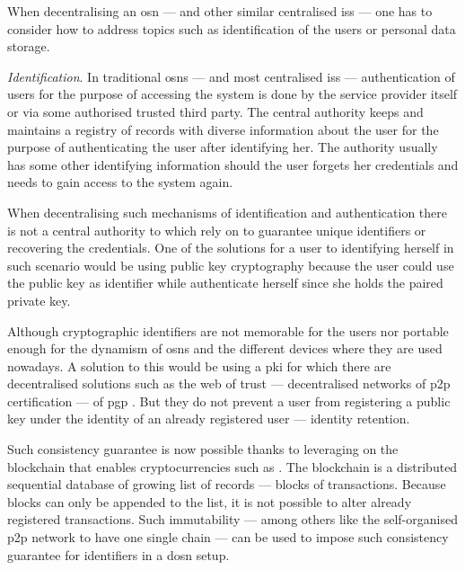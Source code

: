 When decentralising an \ac{osn} --- and other similar centralised \acp{is} --- one 
has to consider how to address topics such as identification of the users or personal 
data storage.

\textit{Identification}. In traditional \acp{osn} --- and most centralised \acp{is} 
--- authentication of users for the purpose of accessing the system is done by the 
service provider itself or via some authorised trusted third party. The central 
authority keeps and maintains a registry of records with diverse information about 
the user for the purpose of authenticating the user after identifying her. The authority 
usually has some other identifying information should the user forgets her credentials 
and needs to gain access to the system again.

When decentralising such mechanisms of identification and authentication there is 
not a central authority to which rely on to guarantee unique identifiers or recovering 
the credentials. One of the solutions for a user to identifying herself in such 
scenario would be using public key cryptography because the user could use the public 
key as identifier while authenticate herself since she holds the paired private key. 

Although cryptographic identifiers are not memorable for the users nor portable 
enough for the dynamism of \acp{osn} and the different devices where they are used 
nowadays. A solution to this would be using a \ac{pki} for which there are decentralised 
solutions such as the web of trust ---  decentralised networks of \ac{p2p} certification 
--- of \ac{pgp} \cite{Stallings95, Abdul97}. But they do not prevent a user from 
registering a public key under the identity of an already registered user --- identity 
retention. 

Such consistency guarantee is now possible thanks to leveraging on the blockchain 
that enables cryptocurrencies such as \Bitcoin \cite{Nakamoto08}. The blockchain 
is a distributed sequential database of growing list of records --- blocks of transactions. 
Because blocks can only be appended to the list, it is not possible to alter already 
registered transactions. Such immutability --- among others like the self-organised 
\ac{p2p} network to have one single chain --- can be used to impose such consistency 
guarantee for identifiers in a \ac{dosn} setup.

